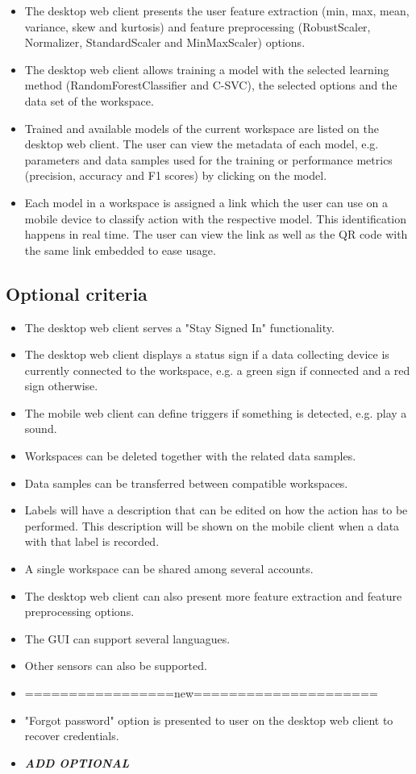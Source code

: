 \begin{itemize}
    \item The desktop web client presents the user feature extraction (min, max, mean, variance, skew and kurtosis) and feature preprocessing (RobustScaler, Normalizer, StandardScaler and MinMaxScaler) options.
    \item The desktop web client allows training a model with the selected learning method (RandomForestClassifier and C-SVC), the selected options and the data set of the workspace.
    \item Trained and available models of the current workspace are listed on the desktop web client. The user can view the metadata of each model, e.g. parameters and data samples used for the training or performance metrics (precision, accuracy and F1 scores) by clicking on the model.
    \item Each model in a workspace is assigned a link which the user can use on a mobile device to classify action with the respective model. This identification happens in real time. The user can view the link as well as the QR code with the same link embedded to ease usage.
\end{itemize}

\subsection{Optional criteria}
\begin{itemize}
    \item The desktop web client serves a "Stay Signed In" functionality.
    \item The desktop web client displays a status sign if a data collecting device is currently connected to the workspace, e.g. a green sign if connected and a red sign otherwise.
    \item The mobile web client can define triggers if something is detected, e.g. play a sound.
    \item Workspaces can be deleted together with the related data samples.
    \item Data samples can be transferred between compatible workspaces.
    \item Labels will have a description that can be edited on how the action has to be performed. This description will be shown on the mobile client when a data with that label is recorded.
    \item A single workspace can be shared among several accounts.
    \item The desktop web client can also present more feature extraction and feature preprocessing options.
    \item The GUI can support several languagues.
    \item Other sensors can also be supported.
    \item =================new=====================
    \item "Forgot password" option is presented to user on the desktop web client to recover credentials.
    \item \textbf{\emph{ADD OPTIONAL}}
\end{itemize}

